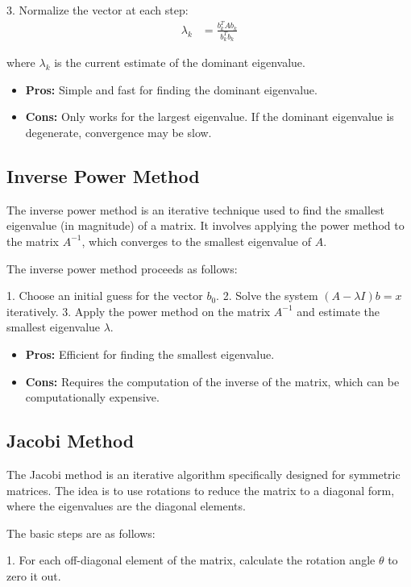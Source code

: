 \documentclass[article]{IEEEtran}
\numberwithin{equation}{enumi}
\numberwithin{figure}{enumi}
\begin{document}
3. Normalize the vector at each step:
\begin{align*}
\lambda_k &= \frac{b_k^T A b_k}{b_k^T b_k}
\end{align*}

where $\lambda_k$ is the current estimate of the dominant eigenvalue.

\begin{itemize}
    \item \textbf{Pros:} Simple and fast for finding the dominant eigenvalue.
    \item \textbf{Cons:} Only works for the largest eigenvalue. If the dominant eigenvalue is degenerate, convergence may be slow.
\end{itemize}

\subsection{Inverse Power Method}
The inverse power method is an iterative technique used to find the smallest eigenvalue (in magnitude) of a matrix. It involves applying the power method to the matrix $A^{-1}$, which converges to the smallest eigenvalue of $A$.

The inverse power method proceeds as follows:

1. Choose an initial guess for the vector $b_0$.
2. Solve the system $(A - \lambda I)b = x$ iteratively.
3. Apply the power method on the matrix $A^{-1}$ and estimate the smallest eigenvalue $\lambda$.

\begin{itemize}
    \item \textbf{Pros:} Efficient for finding the smallest eigenvalue.
    \item \textbf{Cons:} Requires the computation of the inverse of the matrix, which can be computationally expensive.
\end{itemize}

\subsection{Jacobi Method}
The Jacobi method is an iterative algorithm specifically designed for symmetric matrices. The idea is to use rotations to reduce the matrix to a diagonal form, where the eigenvalues are the diagonal elements.

The basic steps are as follows:

1. For each off-diagonal element of the matrix, calculate the rotation angle $\theta$ to zero it out.
\end{document}
